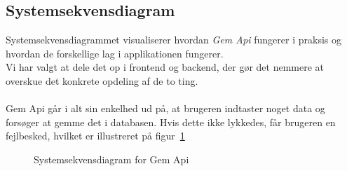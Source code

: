 \subsection{Systemsekvensdiagram}
Systemsekvensdiagrammet visualiserer hvordan \textit{Gem Api} fungerer i praksis og hvordan de forskellige lag i applikationen fungerer.
\\
Vi har valgt at dele det op i frontend og backend, der gør det nemmere at overskue det konkrete opdeling af de to ting.
\\\\
Gem Api går i alt sin enkelhed ud på, at brugeren indtaster noget data og forsøger at gemme det i databasen.
Hvis dette ikke lykkedes, får brugeren en fejlbesked, hvilket er illustreret på figur~\ref{fig:ssd} 
\begin{figure}[H]
    \caption{Systemsekvensdiagram for Gem Api}
\label{fig:ssd}
\end{figure}
